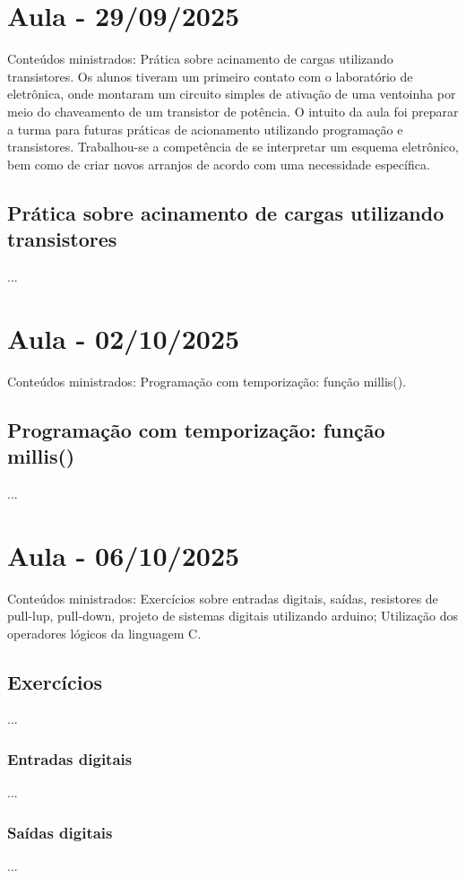 \documentclass{article}
\begin{document}
\section{Aula - 29/09/2025}
Conteúdos ministrados: Prática sobre acinamento de cargas utilizando transistores. Os alunos tiveram um primeiro contato com o laboratório de eletrônica, onde montaram um circuito simples de ativação de uma ventoinha por meio do chaveamento de um transistor de potência. O intuito da aula foi preparar a turma para futuras práticas de acionamento utilizando programação e transistores. Trabalhou-se a competência de se interpretar um esquema eletrônico, bem como de criar novos arranjos de acordo com uma necessidade específica.

\subsection{Prática sobre acinamento de cargas utilizando transistores}
...

\section{Aula - 02/10/2025}
Conteúdos ministrados: Programação com temporização: função millis().

\subsection{Programação com temporização: função millis()}
...

\section{Aula - 06/10/2025}
Conteúdos ministrados: Exercícios sobre entradas digitais, saídas, resistores de pull-lup, pull-down, projeto de sistemas digitais utilizando arduino; Utilização dos operadores lógicos da linguagem C.

\subsection{Exercícios}
...

\subsubsection{Entradas digitais}
...

\subsubsection{Saídas digitais}
...
\end{document}
